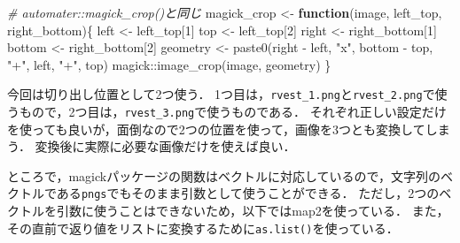\documentclass[
]{article}
\newenvironment{Shaded}{\begin{snugshade}}{\end{snugshade}}
\newcommand{\CommentTok}[1]{\textcolor[rgb]{0.56,0.35,0.01}{\textit{#1}}}
\newcommand{\ControlFlowTok}[1]{\textcolor[rgb]{0.13,0.29,0.53}{\textbf{#1}}}
\newcommand{\DecValTok}[1]{\textcolor[rgb]{0.00,0.00,0.81}{#1}}
\newcommand{\FunctionTok}[1]{\textcolor[rgb]{0.00,0.00,0.00}{#1}}
\newcommand{\NormalTok}[1]{#1}
\newcommand{\OtherTok}[1]{\textcolor[rgb]{0.56,0.35,0.01}{#1}}
\newcommand{\SpecialCharTok}[1]{\textcolor[rgb]{0.00,0.00,0.00}{#1}}
\newcommand{\StringTok}[1]{\textcolor[rgb]{0.31,0.60,0.02}{#1}}
\begin{document}
\begin{Shaded}
\begin{Highlighting}[]
  \CommentTok{\# automater::magick\_crop()と同じ}
\NormalTok{magick\_crop }\OtherTok{\textless{}{-}} \ControlFlowTok{function}\NormalTok{(image, left\_top, right\_bottom)\{}
\NormalTok{  left   }\OtherTok{\textless{}{-}}\NormalTok{ left\_top[}\DecValTok{1}\NormalTok{]}
\NormalTok{  top    }\OtherTok{\textless{}{-}}\NormalTok{ left\_top[}\DecValTok{2}\NormalTok{]}
\NormalTok{  right  }\OtherTok{\textless{}{-}}\NormalTok{ right\_bottom[}\DecValTok{1}\NormalTok{]}
\NormalTok{  bottom }\OtherTok{\textless{}{-}}\NormalTok{ right\_bottom[}\DecValTok{2}\NormalTok{]}
\NormalTok{  geometry }\OtherTok{\textless{}{-}} \FunctionTok{paste0}\NormalTok{(right }\SpecialCharTok{{-}}\NormalTok{ left, }\StringTok{"x"}\NormalTok{, bottom }\SpecialCharTok{{-}}\NormalTok{ top, }\StringTok{"+"}\NormalTok{, left, }\StringTok{"+"}\NormalTok{, top)}
\NormalTok{  magick}\SpecialCharTok{::}\FunctionTok{image\_crop}\NormalTok{(image, geometry)}
\NormalTok{\}}
\end{Highlighting}
\end{Shaded}

今回は切り出し位置として2つ使う．
1つ目は，\texttt{rvest\_1.png}と\texttt{rvest\_2.png}で使うもので，2つ目は，\texttt{rvest\_3.png}で使うものである．
それぞれ正しい設定だけを使っても良いが，面倒なので2つの位置を使って，画像を3つとも変換してしまう．
変換後に実際に必要な画像だけを使えば良い．

ところで，magickパッケージの関数はベクトルに対応しているので，文字列のベクトルである\texttt{pngs}でもそのまま引数として使うことができる．
ただし，2つのベクトルを引数に使うことはできないため，以下ではmap2を使っている．
また，その直前で返り値をリストに変換するために\texttt{as.list()}を使っている．
\end{document}
